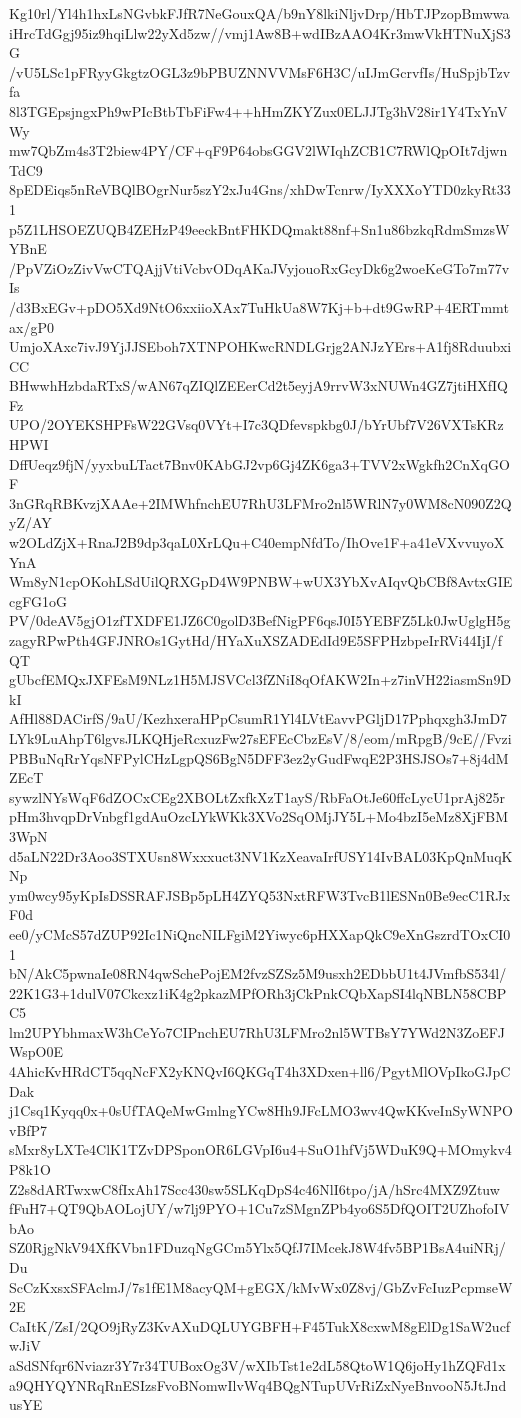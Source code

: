 Kg10rl/Yl4h1hxLsNGvbkFJfR7NeGouxQA/b9nY8lkiNljvDrp/HbTJPzopBmwwa
iHrcTdGgj95iz9hqiLlw22yXd5zw//vmj1Aw8B+wdIBzAAO4Kr3mwVkHTNuXjS3G
/vU5LSc1pFRyyGkgtzOGL3z9bPBUZNNVVMsF6H3C/uIJmGcrvfIs/HuSpjbTzvfa
8l3TGEpsjngxPh9wPIcBtbTbFiFw4++hHmZKYZux0ELJJTg3hV28ir1Y4TxYnVWy
mw7QbZm4s3T2biew4PY/CF+qF9P64obsGGV2lWIqhZCB1C7RWlQpOIt7djwnTdC9
8pEDEiqs5nReVBQlBOgrNur5szY2xJu4Gns/xhDwTcnrw/IyXXXoYTD0zkyRt331
p5Z1LHSOEZUQB4ZEHzP49eeckBntFHKDQmakt88nf+Sn1u86bzkqRdmSmzsWYBnE
/PpVZiOzZivVwCTQAjjVtiVcbvODqAKaJVyjouoRxGcyDk6g2woeKeGTo7m77vIs
/d3BxEGv+pDO5Xd9NtO6xxiioXAx7TuHkUa8W7Kj+b+dt9GwRP+4ERTmmtax/gP0
UmjoXAxc7ivJ9YjJJSEboh7XTNPOHKwcRNDLGrjg2ANJzYErs+A1fj8RduubxiCC
BHwwhHzbdaRTxS/wAN67qZIQlZEEerCd2t5eyjA9rrvW3xNUWn4GZ7jtiHXfIQFz
UPO/2OYEKSHPFsW22GVsq0VYt+I7c3QDfevspkbg0J/bYrUbf7V26VXTsKRzHPWI
DffUeqz9fjN/yyxbuLTact7Bnv0KAbGJ2vp6Gj4ZK6ga3+TVV2xWgkfh2CnXqGOF
3nGRqRBKvzjXAAe+2IMWhfnchEU7RhU3LFMro2nl5WRlN7y0WM8cN090Z2QyZ/AY
w2OLdZjX+RnaJ2B9dp3qaL0XrLQu+C40empNfdTo/IhOve1F+a41eVXvvuyoXYnA
Wm8yN1cpOKohLSdUilQRXGpD4W9PNBW+wUX3YbXvAIqvQbCBf8AvtxGIEcgFG1oG
PV/0deAV5gjO1zfTXDFE1JZ6C0golD3BefNigPF6qsJ0I5YEBFZ5Lk0JwUglgH5g
zagyRPwPth4GFJNROs1GytHd/HYaXuXSZADEdId9E5SFPHzbpeIrRVi44IjI/fQT
gUbcfEMQxJXFEsM9NLz1H5MJSVCcl3fZNiI8qOfAKW2In+z7inVH22iasmSn9DkI
AfHl88DACirfS/9aU/KezhxeraHPpCsumR1Yl4LVtEavvPGljD17Pphqxgh3JmD7
LYk9LuAhpT6lgvsJLKQHjeRcxuzFw27sEFEcCbzEsV/8/eom/mRpgB/9cE//Fvzi
PBBuNqRrYqsNFPylCHzLgpQS6BgN5DFF3ez2yGudFwqE2P3HSJSOs7+8j4dMZEcT
sywzlNYsWqF6dZOCxCEg2XBOLtZxfkXzT1ayS/RbFaOtJe60ffcLycU1prAj825r
pHm3hvqpDrVnbgf1gdAuOzcLYkWKk3XVo2SqOMjJY5L+Mo4bzI5eMz8XjFBM3WpN
d5aLN22Dr3Aoo3STXUsn8Wxxxuct3NV1KzXeavaIrfUSY14IvBAL03KpQnMuqKNp
ym0wcy95yKpIsDSSRAFJSBp5pLH4ZYQ53NxtRFW3TvcB1lESNn0Be9ecC1RJxF0d
ee0/yCMcS57dZUP92Ic1NiQncNILFgiM2Yiwyc6pHXXapQkC9eXnGszrdTOxCI01
bN/AkC5pwnaIe08RN4qwSchePojEM2fvzSZSz5M9usxh2EDbbU1t4JVmfbS534l/
22K1G3+1dulV07Ckcxz1iK4g2pkazMPfORh3jCkPnkCQbXapSI4lqNBLN58CBPC5
lm2UPYbhmaxW3hCeYo7CIPnchEU7RhU3LFMro2nl5WTBsY7YWd2N3ZoEFJWspO0E
4AhicKvHRdCT5qqNcFX2yKNQvI6QKGqT4h3XDxen+ll6/PgytMlOVpIkoGJpCDak
j1Csq1Kyqq0x+0sUfTAQeMwGmlngYCw8Hh9JFcLMO3wv4QwKKveInSyWNPOvBfP7
sMxr8yLXTe4ClK1TZvDPSponOR6LGVpI6u4+SuO1hfVj5WDuK9Q+MOmykv4P8k1O
Z2s8dARTwxwC8fIxAh17Scc430sw5SLKqDpS4c46NlI6tpo/jA/hSrc4MXZ9Ztuw
fFuH7+QT9QbAOLojUY/w7lj9PYO+1Cu7zSMgnZPb4yo6S5DfQOIT2UZhofoIVbAo
SZ0RjgNkV94XfKVbn1FDuzqNgGCm5Ylx5QfJ7IMcekJ8W4fv5BP1BsA4uiNRj/Du
ScCzKxsxSFAclmJ/7s1fE1M8acyQM+gEGX/kMvWx0Z8vj/GbZvFcIuzPcpmseW2E
CaItK/ZsI/2QO9jRyZ3KvAXuDQLUYGBFH+F45TukX8cxwM8gElDg1SaW2ucfwJiV
aSdSNfqr6Nviazr3Y7r34TUBoxOg3V/wXIbTst1e2dL58QtoW1Q6joHy1hZQFd1x
a9QHYQYNRqRnESIzsFvoBNomwIlvWq4BQgNTupUVrRiZxNyeBnvooN5JtJndusYE
